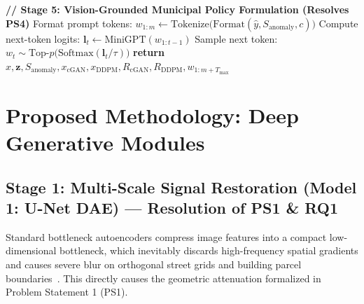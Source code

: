 \documentclass[journal]{IEEEtran}
\begin{document}
\begin{algorithm}[!t]
\begin{algorithmic}[1]
\STATE \textbf{// Stage 5: Vision-Grounded Municipal Policy Formulation (Resolves PS4)}
\STATE Format prompt tokens: $w_{1:m} \leftarrow \text{Tokenize}\big(\text{Format}(\hat{y}, S_{\text{anomaly}}, c)\big)$
    \STATE Compute next-token logits: $\mathbf{l}_t \leftarrow \text{MiniGPT}(w_{1:t-1})$
    \STATE Sample next token: $w_t \sim \text{Top-}p\big(\text{Softmax}(\mathbf{l}_t / \tau)\big)$
\ENDFOR
\STATE \textbf{return} $\hat{x}, \mathbf{z}, S_{\text{anomaly}}, x_{\text{cGAN}}, x_{\text{DDPM}}, R_{\text{cGAN}}, R_{\text{DDPM}}, w_{1:m+T_{\text{max}}}$
\end{algorithmic}
\end{algorithm}

\section{Proposed Methodology: Deep Generative Modules}

\subsection{Stage 1: Multi-Scale Signal Restoration (Model 1: U-Net DAE) --- Resolution of PS1 \& RQ1}
Standard bottleneck autoencoders compress image features into a compact low-dimensional bottleneck, which inevitably discards high-frequency spatial gradients and causes severe blur on orthogonal street grids and building parcel boundaries~\cite{vincent2008extracting,zhang2017beyond}. This directly causes the geometric attenuation formalized in Problem Statement 1 (PS1).
\end{document}
